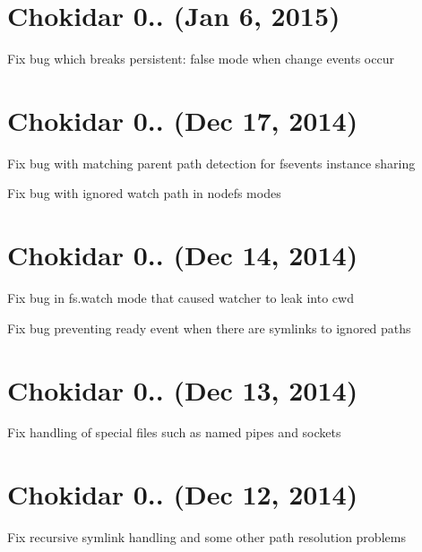\section*{Chokidar 0.. (Jan 6, 2015)}


\begin{DoxyItemize}
\item Fix bug which breaks {\ttfamily persistent\+: false} mode when change events occur
\end{DoxyItemize}

\section*{Chokidar 0.. (Dec 17, 2014)}


\begin{DoxyItemize}
\item Fix bug with matching parent path detection for fsevents instance sharing
\item Fix bug with ignored watch path in nodefs modes
\end{DoxyItemize}

\section*{Chokidar 0.. (Dec 14, 2014)}


\begin{DoxyItemize}
\item Fix bug in {\ttfamily fs.\+watch} mode that caused watcher to leak into {\ttfamily cwd}
\item Fix bug preventing ready event when there are symlinks to ignored paths
\end{DoxyItemize}

\section*{Chokidar 0.. (Dec 13, 2014)}


\begin{DoxyItemize}
\item Fix handling of special files such as named pipes and sockets
\end{DoxyItemize}

\section*{Chokidar 0.. (Dec 12, 2014)}


\begin{DoxyItemize}
\item Fix recursive symlink handling and some other path resolution problems
\end{DoxyItemize}

